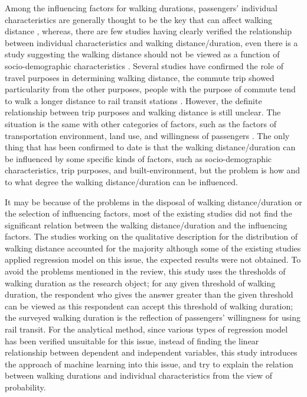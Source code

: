 %
Among the influencing factors for walking durations, passengers' individual characteristics are generally thought to be the key that can affect walking distance \cite{besser2005walking,weinstein2008far,krygsman2004multimodal,yang2012walking,daniels2013explaining,guerra2012half}, whereas, there are few studies having clearly verified the relationship between individual characteristics and walking distance/duration, even there is a study suggesting the walking distance should not be viewed as a function of socio-demographic characteristics \cite{krygsman2004multimodal}. Several studies have confirmed the role of travel purposes in determining walking distance, the commute trip showed particularity from the other purposes, people with the purpose of commute tend to walk a longer distance to rail transit stations \cite{larsen2010beyond}. However, the definite relationship between trip purposes and walking distance is still unclear. The situation is the same with other categories of factors, such as the factors of transportation environment, land use, and willingness of passengers \cite{guerra2012half,krygsman2004multimodal,weinstein2008far}. The only thing that has been confirmed to date is that the walking distance/duration can be influenced by some specific kinds of factors, such as socio-demographic characteristics, trip purposes, and built-environment, but the problem is how and to what degree the walking distance/duration can be influenced.

%
It may be because of the problems in the disposal of walking distance/duration or the selection of influencing factors, most of the existing studies did not find the significant relation between the walking distance/duration and the influencing factors. The studies working on the qualitative description for the distribution of walking distance accounted for the majority although some of the existing studies applied regression model on this issue, the expected results were not obtained. To avoid the problems mentioned in the review, this study uses the thresholds of walking duration as the research object; for any given threshold of walking duration, the respondent who gives the answer greater than the given threshold can be viewed as this respondent can accept this threshold of walking duration; the surveyed walking duration is the reflection of passengers' willingness for using rail transit. For the analytical method, since various types of regression model has been verified unsuitable for this issue, instead of finding the linear relationship between dependent and independent variables, this study introduces the approach of machine learning into this issue, and try to explain the relation between walking durations and individual characteristics from the view of probability.

